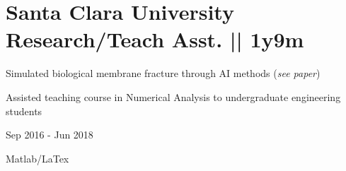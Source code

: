 \section
{\textbf{Santa Clara University} \newline
Research/Teach Asst. || 1y9m}{}


\begin{detail}
\vspace{-2.5ex}
\BulletItem
Simulated biological membrane fracture through AI methods (\textit{see paper})

\BulletItem
Assisted teaching course in Numerical Analysis to undergraduate engineering students
\end{detail}

\begin{subtitle}
\vspace{-7.8ex}
{{Sep 2016 - Jun 2018}} 
\end{subtitle}

\vspace{1ex} 
{\color{cyan}\small {Matlab/LaTex}}

\vspace{0ex}
